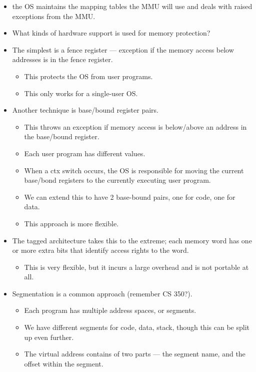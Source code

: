 \documentclass{article}
\begin{document}
\begin{itemize}
    \item the OS maintains the mapping tables the MMU will use and deals with raised exceptions from the MMU.
    \item What kinds of hardware support is used for memory protection?
    \item The simplest is a fence register --- exception if the memory access below addresses is in the fence register.
    \begin{itemize}
        \item This protects the OS from user programs.
        \item This only works for a single-user OS.
    \end{itemize}
    \item Another technique is base/bound register pairs.
        \begin{itemize}
            \item This throws an exception if memory access is below/above an address in the base/bound register.
            \item Each user program has different values.
            \item When a ctx switch occurs, the OS is responsible for moving the current base/bond registers to the currently executing user program.
            \item We can extend this to have 2 base-bound pairs, one for code, one for data.
            \item This approach is more flexible.
        \end{itemize}
    \item The tagged architecture takes this to the extreme; each memory word has one or more extra bits that identify access rights to the word.
        \begin{itemize}
            \item This is very flexible, but it incurs a large overhead and is not portable at all.
        \end{itemize}
    \item Segmentation is a common approach (remember CS 350?).
        \begin{itemize}
            \item Each program has multiple address spaces, or segments.
            \item We have different segments for code, data, stack, though this can be split up even further.
            \item The virtual address contains of two parts --- the segment name, and the offset within the segment.

\end{itemize}
\end{itemize}
\end{document}
